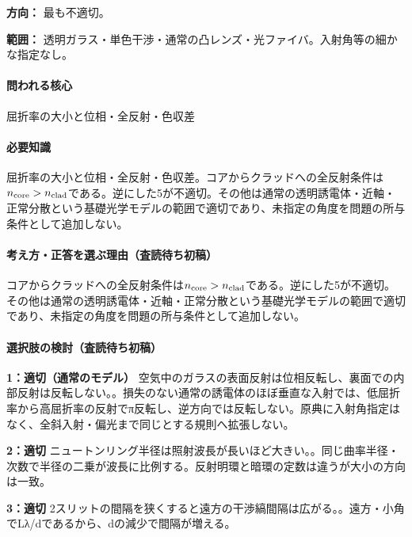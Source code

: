 \noindent\textbf{方向：} 最も不適切。\par

\noindent\textbf{範囲：} 透明ガラス・単色干渉・通常の凸レンズ・光ファイバ。入射角等の細かな指定なし。\par

\paragraph{問われる核心} 屈折率の大小と位相・全反射・色収差

\paragraph{必要知識} 屈折率の大小と位相・全反射・色収差。コアからクラッドへの全反射条件は\(n_{\rm core}>n_{\rm clad}\)である。逆にした5が不適切。その他は通常の透明誘電体・近軸・正常分散という基礎光学モデルの範囲で適切であり、未指定の角度を問題の所与条件として追加しない。

\paragraph{考え方・正答を選ぶ理由（査読待ち初稿）} コアからクラッドへの全反射条件は\(n_{\rm core}>n_{\rm clad}\)である。逆にした5が不適切。その他は通常の透明誘電体・近軸・正常分散という基礎光学モデルの範囲で適切であり、未指定の角度を問題の所与条件として追加しない。

\paragraph{選択肢の検討（査読待ち初稿）}\mbox{}\par

\noindent\textbf{1：適切（通常のモデル）} 空気中のガラスの表面反射は位相反転し、裏面での内部反射は反転しない。。損失のない通常の誘電体のほぼ垂直な入射では、低屈折率から高屈折率の反射でπ反転し、逆方向では反転しない。原典に入射角指定はなく、全斜入射・偏光まで同じとする規則へ拡張しない。\par

\noindent\textbf{2：適切} ニュートンリング半径は照射波長が長いほど大きい。。同じ曲率半径・次数で半径の二乗が波長に比例する。反射明環と暗環の定数は違うが大小の方向は一致。\par

\noindent\textbf{3：適切} 2スリットの間隔を狭くすると遠方の干渉縞間隔は広がる。。遠方・小角でLλ/dであるから、dの減少で間隔が増える。\par

